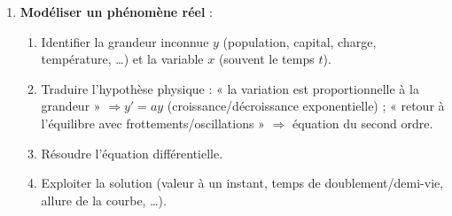 \documentclass[11pt]{article}
\begin{document}
\begin{methode}
\begin{enumerate}
\begin{enumerate}
        \end{enumerate}
  \item \textbf{Modéliser un phénomène réel} :
        \begin{enumerate}
          \item Identifier la grandeur inconnue $y$ (population, capital, charge, température, \dots) et la variable $x$ (souvent le temps $t$).
          \item Traduire l'hypothèse physique : « la variation est proportionnelle à la grandeur » $\Rightarrow y' = ay$ (croissance/décroissance exponentielle) ; « retour à l'équilibre avec frottements/oscillations » $\Rightarrow$ équation du second ordre.
          \item Résoudre l'équation différentielle.
          \item Exploiter la solution (valeur à un instant, temps de doublement/demi-vie, allure de la courbe, \dots).
        \end{enumerate}
\end{enumerate}
\end{methode}
\end{document}
